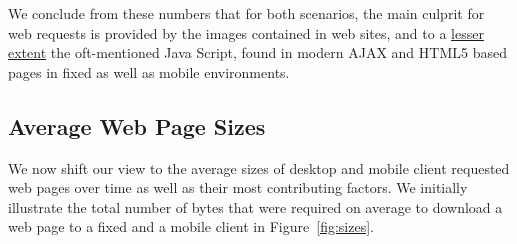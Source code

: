 \documentclass[onecolumn,12pt]{IEEEtran}
\begin{document}
We conclude from these numbers that for both scenarios, the main culprit for web requests is provided by the images contained in web sites, and to a \uline{lesser extent} the oft-mentioned Java Script, found in modern AJAX and HTML5 based pages in fixed as well as mobile environments.



\subsection{Average Web Page Sizes}
\label{ss:bytes}
We now shift our view to the average sizes of desktop and mobile client requested web pages over time as well as their most contributing factors.
We initially illustrate the total number of bytes that were required on average to download a web page to a fixed and a mobile client in Figure~\ref{fig:sizes}.
\end{document}
